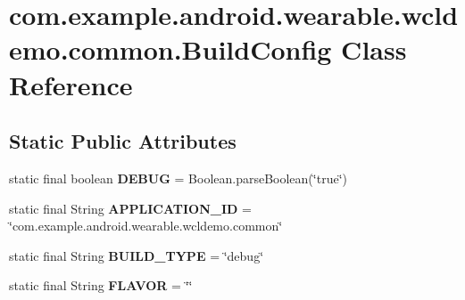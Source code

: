 \hypertarget{classcom_1_1example_1_1android_1_1wearable_1_1wcldemo_1_1common_1_1BuildConfig}{}\section{com.\+example.\+android.\+wearable.\+wcldemo.\+common.\+Build\+Config Class Reference}
\label{classcom_1_1example_1_1android_1_1wearable_1_1wcldemo_1_1common_1_1BuildConfig}
\subsection*{Static Public Attributes}
\begin{DoxyCompactItemize}
\item 
static final boolean {\bfseries D\+E\+B\+UG} = Boolean.\+parse\+Boolean(\char`\"{}true\char`\"{})\hypertarget{classcom_1_1example_1_1android_1_1wearable_1_1wcldemo_1_1common_1_1BuildConfig_a7b60ab0428e455c1da708ec874ca8720}{}\label{classcom_1_1example_1_1android_1_1wearable_1_1wcldemo_1_1common_1_1BuildConfig_a7b60ab0428e455c1da708ec874ca8720}

\item 
static final String {\bfseries A\+P\+P\+L\+I\+C\+A\+T\+I\+O\+N\+\_\+\+ID} = \char`\"{}com.\+example.\+android.\+wearable.\+wcldemo.\+common\char`\"{}\hypertarget{classcom_1_1example_1_1android_1_1wearable_1_1wcldemo_1_1common_1_1BuildConfig_ad0639747afc7dd68b9dc60bf6f73a0e9}{}\label{classcom_1_1example_1_1android_1_1wearable_1_1wcldemo_1_1common_1_1BuildConfig_ad0639747afc7dd68b9dc60bf6f73a0e9}

\item 
static final String {\bfseries B\+U\+I\+L\+D\+\_\+\+T\+Y\+PE} = \char`\"{}debug\char`\"{}\hypertarget{classcom_1_1example_1_1android_1_1wearable_1_1wcldemo_1_1common_1_1BuildConfig_aa8db31efdf6d25daa26f03af4781b9a9}{}\label{classcom_1_1example_1_1android_1_1wearable_1_1wcldemo_1_1common_1_1BuildConfig_aa8db31efdf6d25daa26f03af4781b9a9}

\item 
static final String {\bfseries F\+L\+A\+V\+OR} = \char`\"{}\char`\"{}\hypertarget{classcom_1_1example_1_1android_1_1wearable_1_1wcldemo_1_1common_1_1BuildConfig_a05ebbd5dc87363106c0ed8ccf6a0edd3}{}\label{classcom_1_1example_1_1android_1_1wearable_1_1wcldemo_1_1common_1_1BuildConfig_a05ebbd5dc87363106c0ed8ccf6a0edd3}


\end{DoxyCompactItemize}
